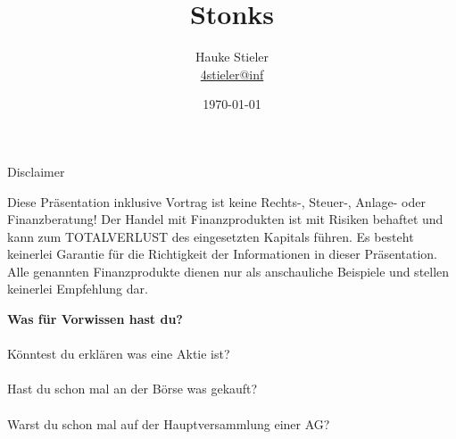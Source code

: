 \documentclass{beamer}
\author[Hauke Stieler]{Hauke Stieler\\\href{mailto:4stieler@informatik.uni-hamburg.de}{4stieler@inf}}
\title{Stonks}
\date{\today}
\begin{document}
	{
		\maketitle
		\addtocounter{page}{-1}
	}
	
	\begin{frame}{Disclaimer}
		\begin{center}
			Diese Präsentation inklusive Vortrag ist keine Rechts-, Steuer-, Anlage- oder Finanzberatung!\n
			Der Handel mit Finanzprodukten ist mit Risiken behaftet und kann zum TOTALVERLUST des eingesetzten Kapitals führen.\n
			Es besteht keinerlei Garantie für die Richtigkeit der Informationen in dieser Präsentation.\n
			Alle genannten Finanzprodukte dienen nur als anschauliche Beispiele und stellen keinerlei Empfehlung dar.
		\end{center}
	\end{frame}

	\begin{frame}
		\begin{center}
			\textbf{Was für Vorwissen hast du?}\\\pause
			\hfill\\
			Könntest du erklären was eine Aktie ist?\\\pause
			\hfill\\
			Hast du schon mal an der Börse was gekauft?\\\pause
			\hfill\\
			Warst du schon mal auf der Hauptversammlung einer AG?
		\end{center}
	\end{frame}
\end{document}
